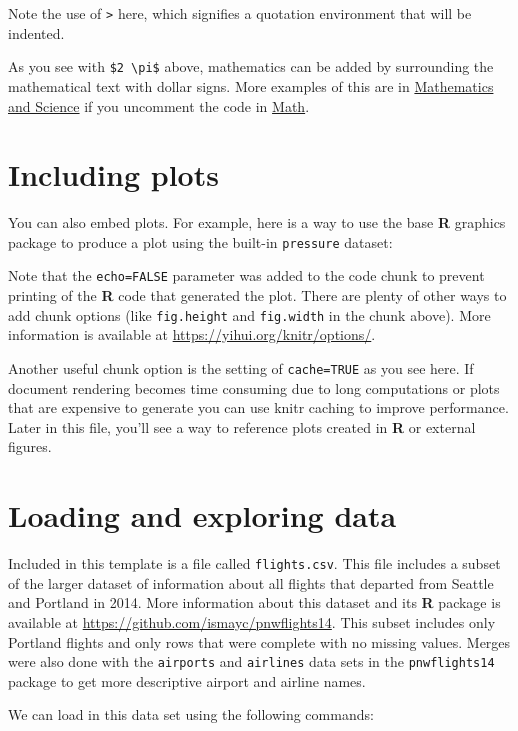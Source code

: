\documentclass[12pt,twoside]{book}
\begin{document}
Note the use of \texttt{\textgreater{}} here, which signifies a quotation environment that will be indented.

As you see with \texttt{\$2\ \textbackslash{}pi\$} above, mathematics can be added by surrounding the mathematical text with dollar signs. More examples of this are in \hyperref[math-sci]{Mathematics and Science} if you uncomment the code in \hyperref[math]{Math}.

\section{Including plots}\label{including-plots}

You can also embed plots. For example, here is a way to use the base \textbf{R} graphics package to produce a plot using the built-in \texttt{pressure} dataset:

Note that the \texttt{echo=FALSE} parameter was added to the code chunk to prevent printing of the \textbf{R} code that generated the plot. There are plenty of other ways to add chunk options (like \texttt{fig.height} and \texttt{fig.width} in the chunk above). More information is available at \url{https://yihui.org/knitr/options/}.

Another useful chunk option is the setting of \texttt{cache=TRUE} as you see here. If document rendering becomes time consuming due to long computations or plots that are expensive to generate you can use knitr caching to improve performance. Later in this file, you'll see a way to reference plots created in \textbf{R} or external figures.

\section{Loading and exploring data}\label{loading-and-exploring-data}

Included in this template is a file called \texttt{flights.csv}. This file includes a subset of the larger dataset of information about all flights that departed from Seattle and Portland in 2014. More information about this dataset and its \textbf{R} package is available at \url{https://github.com/ismayc/pnwflights14}. This subset includes only Portland flights and only rows that were complete with no missing values. Merges were also done with the \texttt{airports} and \texttt{airlines} data sets in the \texttt{pnwflights14} package to get more descriptive airport and airline names.

We can load in this data set using the following commands:
\end{document}
